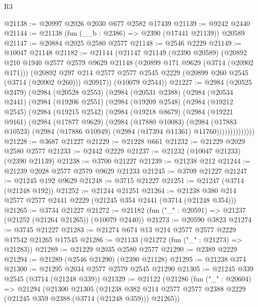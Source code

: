 \begin{lexlean}{R3}
\begin{coremodule}
@21138 := @20997 @2026 @2030 @677 @2582 @17439
@21139 := @9242 @2440
@21144 := @21138 (fun (__b : @2386) => @2390 (@17441 @21139)) @20589
@21147 := @20884 @2025 @2580 @2577
@21148 := @2546 @2229
@21149 := @10047 @21148
@21182 := @21144
    (@21147
      @21149
      (@2390 @20589)
      (@20892
        @210
        @1940
        @2577
        @2579
        @9629
        @21148
        (@20899 @171 @9629 (@3714 (@20902 @171)))
        (@20892 @297 @214 @2577 @2577 @2545 @2229 (@20899 @260 @2545 (@3714 (@20902 @260))) @20917))
      (@10079 @2544))
@21227 := @2984
    (@20525 @2479)
    (@2984
      (@20528 @2553)
      (@2984
        (@20531 @2388)
        (@2984
          (@20534 @2441)
          (@2984
            (@19206 @2551)
            (@2984
              (@19209 @2548)
              (@2984
                (@19212 @2545)
                (@2984
                  (@19215 @2542)
                  (@2984
                    (@19218 @8679)
                    (@2984
                      (@19221 @9161)
                      (@2984
                        (@17877 @9629)
                        (@2984
                          (@17880 @10083)
                          (@2984
                            (@17883 @10523)
                            (@2984 (@17886 @10949) (@2984 (@17394 @11361) @11760))))))))))))))
@21228 := @3687 @21227
@21229 := @21228 @661
@21232 := @21229 @2029 @2580 @2577
@21233 := @2442 @2229
@21237 := @21232 (@10047 @21233) (@2390 @21139)
@21238 := @3700 @21227
@21239 := @21238 @212
@21244 := @21239 @2028 @2577 @2579 @9629 @21233
@21245 := @3709 @21227
@21247 := @21245 @192 @9629
@21248 := @3715 @21227
@21251 := @21247 (@3714 (@21248 @192))
@21252 := @21244 @21251
@21264 := @21238 @380 @214 @2577 @2577 @2441 @2229 (@21245 @354 @2441 (@3714 (@21248 @354)))
@21265 := @3734 @21227
@21272 := @21182 (fun ("_" : @20591) => @21237 (@21252 (@21264 @21265)) (@10079 @2440))
@21273 := @20590 @3823
@21274 := @3745 @21227
@21283 := @21274 @674 @13 @214 @2577 @2577 @2229 @17542 @21265 @17545
@21286 := @21133 (@21272 (fun ("_" : @21273) => @21283))
@21289 := @21229 @2035 @2580 @2577
@21290 := @2389 @2229
@21294 := @21289 (@2546 @21290) (@2390 @21128)
@21295 := @21238 @374
@21300 := @21295 @2034 @2577 @2579 @2545 @21290
@21305 := @21245 @339 @2545 (@3714 (@21248 @339))
@21329 := @21122
    (@21286
      (fun ("_" : @20604) =>
      @21294
        (@21300
          @21305
          (@21238
            @382
            @214
            @2577
            @2577
            @2388
            @2229
            (@21245 @359 @2388 (@3714 (@21248 @359)))
            @21265))

\end{coremodule}
\end{lexlean}
